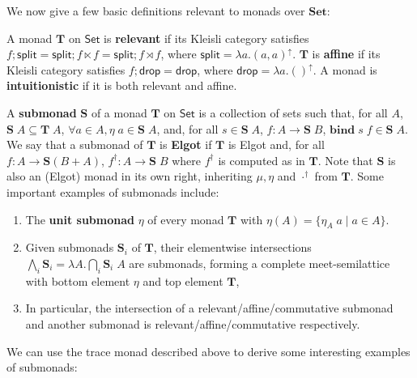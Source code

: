 \documentclass[acmsmall,screen,review]{acmart}
\newcommand{\mb}[1]{\ensuremath{\mathbf{#1}}}
\newcommand{\ms}[1]{\ensuremath{\mathsf{#1}}}
\newcommand{\upg}[2]{{#1}^{\uparrow #2}}
\begin{document}
We now give a few basic definitions relevant to monads over \(\mb{Set}\):
\begin{definition}
  A monad \(\mb{T}\) on \(\ms{Set}\) is \textbf{relevant} if its Kleisli
  category satisfies \(f;\ms{split} = \ms{split};f \ltimes f = \ms{split};f
  \rtimes f\), where \(\ms{split} = \upg{\lambda a. (a, a)}{}\). \(\mb{T}\) is
  \textbf{affine} if its Kleisli category satisfies \(f;\ms{drop} = \ms{drop}\),
  where \(\ms{drop} = \upg{\lambda a.()}{}\). A monad is \textbf{intuitionistic}
  if it is both relevant and affine.
\end{definition}
\begin{definition}[Submonad] 
  A \textbf{submonad} \(\mb{S}\) of a monad \(\mb{T}\) on \(\ms{Set}\) is a
  collection of sets such that, for all \(A\), \(\mb{S}\;A \subseteq
  \mb{T}\;A\), \(\forall a \in A, \eta\;a \in \mb{S}\;A\), and, for all \(s \in
  \mb{S}\;A\), \(f: A \to \mb{S}\;B\), \(\mb{bind}\;s\;f \in \mb{S}\;A\). We say
  that a submonad of \(\mb{T}\) is \textbf{Elgot} if \(\mb{T}\) is Elgot and,
  for all \(f: A \to \mb{S}(B + A)\), \(f^\dagger: A \to \mb{S}\;B\) where
  \(f^\dagger\) is computed as in \(\mb{T}\). Note that \(\mb{S}\) is also an
  (Elgot) monad in its own right, inheriting \(\mu, \eta\) and \(\cdot^\dagger\)
  from \(\mb{T}\). Some important examples of submonads include:
  \begin{enumerate}
    \item The \textbf{unit submonad} \(\eta\) of every monad \(\mb{T}\) with
    \(\eta(A) = \{\eta_A\;a \mid a \in A\}\).
    \item Given submonads \(\mb{S}_i\) of \(\mb{T}\), their elementwise
    intersections \(\bigwedge_i\mb{S}_i = \lambda A. \bigcap_i \mb{S}_i\;A\) are
    submonads, forming a complete meet-semilattice with bottom element \(\eta\)
    and top element \(\mb{T}\),
    \item In particular, the intersection of a relevant/affine/commutative
    submonad and another submonad is relevant/affine/commutative respectively.
  \end{enumerate}
\end{definition} 
We can use the trace monad described above to derive some interesting examples
of submonads:
\end{document}
